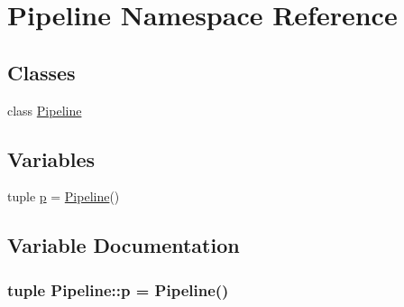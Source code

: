 \hypertarget{namespace_pipeline}{\section{\-Pipeline \-Namespace \-Reference}
\label{namespace_pipeline}
}
\subsection*{\-Classes}
\begin{DoxyCompactItemize}
\item 
class \hyperlink{class_pipeline_1_1_pipeline}{\-Pipeline}
\end{DoxyCompactItemize}
\subsection*{\-Variables}
\begin{DoxyCompactItemize}
\item 
tuple \hyperlink{namespace_pipeline_a4d5e49b87967c4864776884a09d08cf5}{p} = \hyperlink{class_pipeline_1_1_pipeline}{\-Pipeline}()
\end{DoxyCompactItemize}


\subsection{\-Variable \-Documentation}
\hypertarget{namespace_pipeline_a4d5e49b87967c4864776884a09d08cf5}{
\subsubsection[{p}]{\setlength{\rightskip}{0pt plus 5cm}tuple {\bf \-Pipeline\-::p} = {\bf \-Pipeline}()}}\label{namespace_pipeline_a4d5e49b87967c4864776884a09d08cf5}
